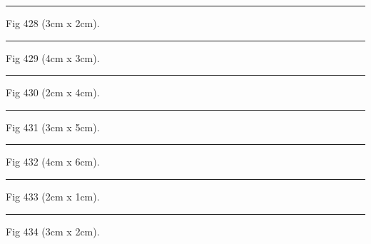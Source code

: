 \documentclass[a4paper,11pt]{article}
\begin{document}
\begin{swarmwrap}%
  \begin{minipage}[t]{3cm}
    \centering
    \rule{\linewidth}{2cm}
    {\footnotesize Fig 428 (3cm x 2cm).}
  \end{minipage}%
\end{swarmwrap}%
\swarmwrapnext
\lipsum[128]%

\begin{swarmwrap}%
  \begin{minipage}[t]{4cm}
    \centering
    \rule{\linewidth}{3cm}
    {\footnotesize Fig 429 (4cm x 3cm).}
  \end{minipage}%
\end{swarmwrap}%
\swarmwrapnext
\lipsum[129]%

\begin{swarmwrap}%
  \begin{minipage}[t]{2cm}
    \centering
    \rule{\linewidth}{4cm}
    {\footnotesize Fig 430 (2cm x 4cm).}
  \end{minipage}%
\end{swarmwrap}%
\swarmwrapnext
\lipsum[130]%

\begin{swarmwrap}%
  \begin{minipage}[t]{3cm}
    \centering
    \rule{\linewidth}{5cm}
    {\footnotesize Fig 431 (3cm x 5cm).}
  \end{minipage}%
\end{swarmwrap}%
\swarmwrapnext
\lipsum[131]%

\begin{swarmwrap}%
  \begin{minipage}[t]{4cm}
    \centering
    \rule{\linewidth}{6cm}
    {\footnotesize Fig 432 (4cm x 6cm).}
  \end{minipage}%
\end{swarmwrap}%
\swarmwrapnext
\lipsum[132]%

\begin{swarmwrap}%
  \begin{minipage}[t]{2cm}
    \centering
    \rule{\linewidth}{1cm}
    {\footnotesize Fig 433 (2cm x 1cm).}
  \end{minipage}%
\end{swarmwrap}%
\swarmwrapnext
\lipsum[133]%

\begin{swarmwrap}%
  \begin{minipage}[t]{3cm}
    \centering
    \rule{\linewidth}{2cm}
    {\footnotesize Fig 434 (3cm x 2cm).}
  \end{minipage}%
\end{swarmwrap}%
\swarmwrapnext
\lipsum[134]%
\end{document}
